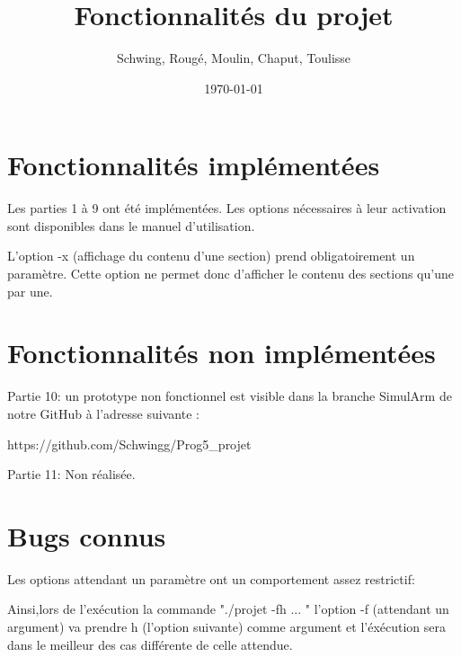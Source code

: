 \documentclass[12pt, a4paper]{article}
\title{Fonctionnalités du projet}
\author{Schwing, Roug\'e, Moulin, Chaput, Toulisse}
\date{\today}
\begin{document}
\maketitle

\section{Fonctionnalités implémentées}

Les parties 1 à 9 ont été implémentées.
Les options nécessaires à leur activation sont disponibles dans le manuel d'utilisation.


L'option -x (affichage du contenu d'une section) prend obligatoirement un paramètre.
Cette option ne permet donc d'afficher le contenu des sections qu'une par une.


\section{Fonctionnalités non implémentées}

Partie 10: un prototype non fonctionnel est visible dans la branche SimulArm de notre GitHub à l'adresse suivante :

https://github.com/Schwingg/Prog5_projet


Partie 11: Non réalisée.


\section{Bugs connus}

Les options attendant un paramètre ont un comportement assez restrictif:

Ainsi,lors de l'exécution la commande "./projet -fh ... " l'option -f (attendant un argument) va prendre h (l'option suivante) comme argument et l'éxécution sera dans le meilleur des cas différente de celle attendue.
\end{document}
